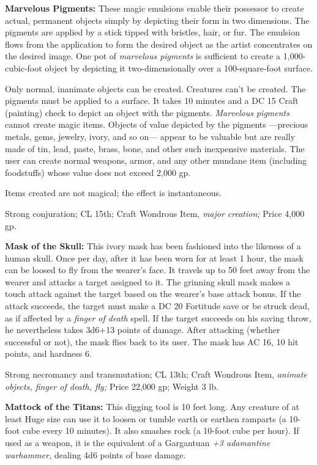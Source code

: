\textbf{Marvelous Pigments:} These magic emulsions enable their possessor to create 
actual, permanent objects simply by depicting their form in two dimensions. The 
pigments are applied by a stick tipped with bristles, hair, or fur. The emulsion 
flows from the application to form the desired object as the artist concentrates 
on the desired image. One pot of \textit{marvelous pigments }is sufficient to create 
a 1,000-cubic-foot object by depicting it two-dimensionally over a 100-square-foot 
surface. 

Only normal, inanimate objects can be created. Creatures can't be created. The 
pigments must be applied to a surface. It takes 10 minutes and a DC 15 Craft (painting) 
check to depict an object with the pigments. \textit{Marvelous pigments }cannot 
create magic items. Objects of value depicted by the pigments ---precious metals, 
gems, jewelry, ivory, and so on--- appear to be valuable but are really made of 
tin, lead, paste, brass, bone, and other such inexpensive materials. The user can 
create normal weapons, armor, and any other mundane item (including foodstuffs) 
whose value does not exceed 2,000 gp.

Items created are not magical; the effect is instantaneous.

Strong conjuration; CL 15th; Craft Wondrous Item, \textit{major creation; }Price 
4,000 gp.

\textbf{Mask of the Skull:} This ivory mask has been fashioned into the likeness 
of a human skull. Once per day, after it has been worn for at least 1 hour, the 
mask can be loosed to fly from the wearer's face. It travels up to 50 feet away 
from the wearer and attacks a target assigned to it. The grinning skull mask makes 
a touch attack against the target based on the wearer's base attack bonus. If the 
attack succeeds, the target must make a DC 20 Fortitude save or be struck dead, 
as if affected by a \textit{finger of death }spell. If the target succeeds on his 
saving throw, he nevertheless takes 3d6+13 points of damage. After attacking (whether 
successful or not), the mask flies back to its user. The mask has AC 16, 10 hit 
points, and hardness 6.

Strong necromancy and transmutation; CL 13th; Craft Wondrous Item, \textit{animate 
objects, finger of death, fly; }Price 22,000 gp; Weight 3 lb.

\textbf{Mattock of the Titans:} This digging tool is 10 feet long. Any creature 
of at least Huge size can use it to loosen or tumble earth or earthen ramparts 
(a 10-foot cube every 10 minutes). It also smashes rock (a 10-foot cube per hour). 
If used as a weapon, it is the equivalent of a Gargantuan \textit{+3 adamantine 
warhammer, }dealing 4d6 points of base damage.

